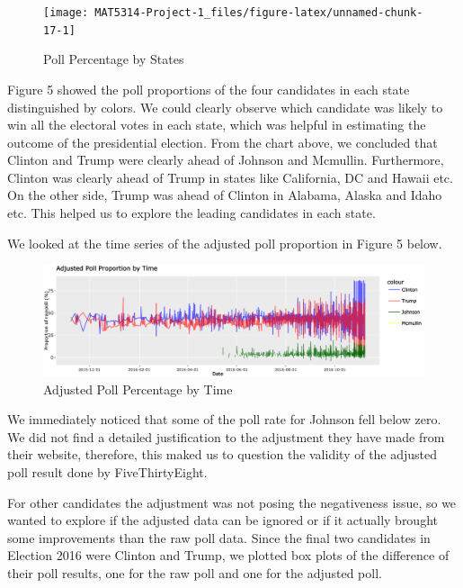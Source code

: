 \documentclass[
  11pt,
]{article}
\begin{document}
\begin{minipage}[t]{0.7\textwidth}
\begin{figure}
\texttt{[image: MAT5314-Project-1\_files/figure-latex/unnamed-chunk-17-1]} \caption{Poll Percentage by States}\label{fig:unnamed-chunk-17}
\end{figure}
\end{minipage}
\begin{minipage}[t]{0.3\textwidth}
\vspace{0pt}
Figure 5 showed the poll proportions of the four candidates in each state distinguished by colors. We could clearly observe which candidate was likely to win all the electoral votes in each state, which was helpful in estimating the outcome of the presidential election. From the chart above, we concluded that Clinton and Trump were clearly ahead of Johnson and Mcmullin. Furthermore, Clinton was clearly ahead of Trump in states like California, DC and Hawaii etc. On the other side, Trump was ahead of Clinton in Alabama, Alaska and Idaho etc. This helped us to explore the leading candidates in each state.
\end{minipage}

We looked at the time series of the adjusted poll proportion in Figure 5
below.

\begin{figure}

{\centering \includegraphics{./Figures/TsChart} 

}

\caption{Adjusted Poll Percentage by Time}\label{fig:unnamed-chunk-19}
\end{figure}

We immediately noticed that some of the poll rate for Johnson fell below
zero. We did not find a detailed justification to the adjustment they
have made from their website, therefore, this maked us to question the
validity of the adjusted poll result done by FiveThirtyEight.

For other candidates the adjustment was not posing the negativeness
issue, so we wanted to explore if the adjusted data can be ignored or if
it actually brought some improvements than the raw poll data. Since the
final two candidates in Election 2016 were Clinton and Trump, we plotted
box plots of the difference of their poll results, one for the raw poll
and one for the adjusted poll.
\end{document}
